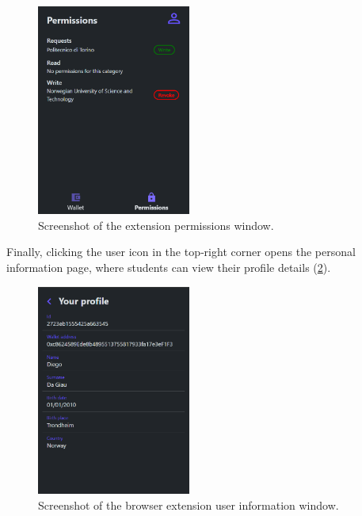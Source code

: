 \begin{figure}
  \centering
  \includegraphics[width=0.45\textwidth]{figures/Permissions.png}
  \caption[Browser extension permissions page]{Screenshot of the extension permissions window.}
  \label{fig:permissionsExt}
\end{figure}

Finally, clicking the user icon in the top‐right corner opens the personal information page, where students can view their profile details (\cref{fig:userInfoExt}).

\begin{figure}
  \centering
  \includegraphics[width=0.45\textwidth]{figures/PersonalInfo.png}
  \caption[Browser extension user information page]{Screenshot of the browser extension user information window.}
  \label{fig:userInfoExt}
\end{figure}

